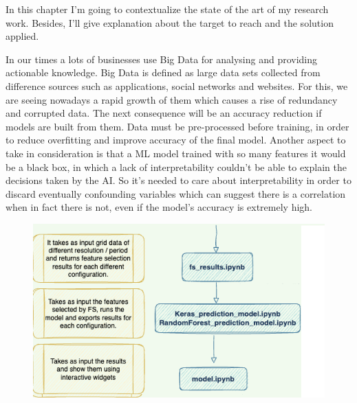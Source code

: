 In this chapter I'm going to contextualize the state of the art of my research work. 
Besides, I'll give explanation about the target to reach and the solution applied.\par
In our times a lots of businesses use Big Data for analysing and providing actionable knowledge.
Big Data is defined as large data sets collected from difference sources such as applications, social networks and websites.
For this, we are seeing nowadays a rapid growth of them which  causes a rise of redundancy and corrupted data.
The next consequence will be an accuracy reduction if models are built from them.
Data must be pre-processed before training, in order to reduce overfitting and improve accuracy of the final model.\newline
Another aspect to take in consideration is that a ML model trained with so many features it would be a black box, in which a lack of interpretability couldn't be able to explain the decisions taken by the AI.
So it's needed to care about interpretability in order to discard eventually confounding variables  which can suggest there is a correlation when in fact there is not, even if the model's accuracy is extremely high. \newline
\begin{figure}[H]
    \centering
    \includegraphics[scale=0.35]{images/overview _notebooks.png}
    \caption{}
    \label{fig:overview}
\end{figure}

